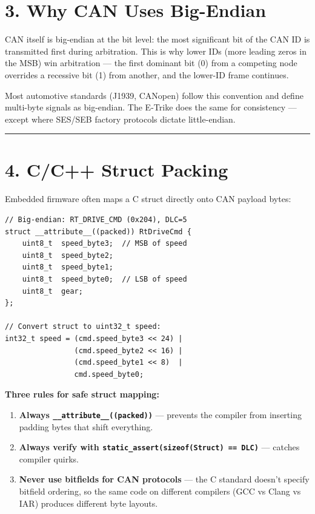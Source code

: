 \documentclass[12pt,a4paper,oneside]{report}
\providecommand{\tightlist}{\setlength{\itemsep}{0pt}\setlength{\parskip}{0pt}}
\begin{document}
\section{3. Why CAN Uses Big-Endian}\label{why-can-uses-big-endian}

CAN itself is big-endian at the bit level: the most significant bit of the CAN
ID is transmitted first during arbitration. This is why lower IDs (more leading
zeros in the MSB) win arbitration --- the first dominant bit (0) from a
competing node overrides a recessive bit (1) from another, and the lower-ID
frame continues.

Most automotive standards (J1939, CANopen) follow this convention and define
multi-byte signals as big-endian. The E-Trike does the same for consistency ---
except where SES/SEB factory protocols dictate little-endian.

\begin{center}\rule{0.5\linewidth}{0.5pt}\end{center}

\section{4. C/C++ Struct Packing}\label{cc-struct-packing}

Embedded firmware often maps a C struct directly onto CAN payload bytes:

\begin{verbatim}
// Big-endian: RT_DRIVE_CMD (0x204), DLC=5
struct __attribute__((packed)) RtDriveCmd {
    uint8_t  speed_byte3;  // MSB of speed
    uint8_t  speed_byte2;
    uint8_t  speed_byte1;
    uint8_t  speed_byte0;  // LSB of speed
    uint8_t  gear;
};

// Convert struct to uint32_t speed:
int32_t speed = (cmd.speed_byte3 << 24) |
                (cmd.speed_byte2 << 16) |
                (cmd.speed_byte1 << 8)  |
                cmd.speed_byte0;
\end{verbatim}

\textbf{Three rules for safe struct mapping:}

\begin{enumerate}
\def\labelenumi{\arabic{enumi}.}
\tightlist
\item
  \textbf{Always \texttt{\_\_attribute\_\_((packed))}} --- prevents the compiler
  from inserting padding bytes that shift everything.
\item
  \textbf{Always verify with \texttt{static\_assert(sizeof(Struct)\ ==\ DLC)}}
  --- catches compiler quirks.
\item
  \textbf{Never use bitfields for CAN protocols} --- the C standard doesn't
  specify bitfield ordering, so the same code on different compilers (GCC vs
  Clang vs IAR) produces different byte layouts.
\end{enumerate}
\end{document}
